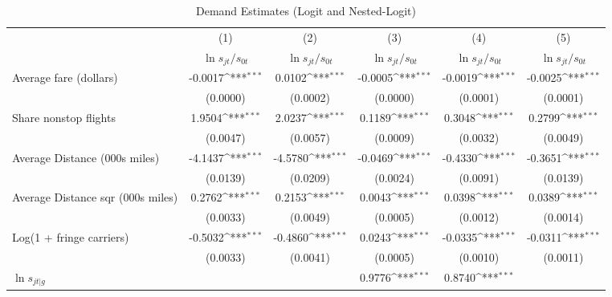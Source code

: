 \begin{table}[htbp]\centering
\def\sym#1{\ifmmode^{#1}\else\(^{#1}\)\fi}
\caption{Demand Estimates (Logit and Nested-Logit)}
\begin{tabular}{l*{5}{c}}
\toprule
                    &\multicolumn{1}{c}{(1)}&\multicolumn{1}{c}{(2)}&\multicolumn{1}{c}{(3)}&\multicolumn{1}{c}{(4)}&\multicolumn{1}{c}{(5)}\\
                    &\multicolumn{1}{c}{$\ln s_{jt}/s_{0t}$}&\multicolumn{1}{c}{$\ln s_{jt}/s_{0t}$}&\multicolumn{1}{c}{$\ln s_{jt}/s_{0t}$}&\multicolumn{1}{c}{$\ln s_{jt}/s_{0t}$}&\multicolumn{1}{c}{$\ln s_{jt}/s_{0t}$}\\
\midrule
Average fare (dollars)&     -0.0017\sym{***}&      0.0102\sym{***}&     -0.0005\sym{***}&     -0.0019\sym{***}&     -0.0025\sym{***}\\
                    &    (0.0000)         &    (0.0002)         &    (0.0000)         &    (0.0001)         &    (0.0001)         \\
\addlinespace
Share nonstop flights &      1.9504\sym{***}&      2.0237\sym{***}&      0.1189\sym{***}&      0.3048\sym{***}&      0.2799\sym{***}\\
                    &    (0.0047)         &    (0.0057)         &    (0.0009)         &    (0.0032)         &    (0.0049)         \\
\addlinespace
Average Distance (000s miles)&     -4.1437\sym{***}&     -4.5780\sym{***}&     -0.0469\sym{***}&     -0.4330\sym{***}&     -0.3651\sym{***}\\
                    &    (0.0139)         &    (0.0209)         &    (0.0024)         &    (0.0091)         &    (0.0139)         \\
\addlinespace
Average Distance sqr (000s miles)&      0.2762\sym{***}&      0.2153\sym{***}&      0.0043\sym{***}&      0.0398\sym{***}&      0.0389\sym{***}\\
                    &    (0.0033)         &    (0.0049)         &    (0.0005)         &    (0.0012)         &    (0.0014)         \\
\addlinespace
Log(1 + fringe carriers)&     -0.5032\sym{***}&     -0.4860\sym{***}&      0.0243\sym{***}&     -0.0335\sym{***}&     -0.0311\sym{***}\\
                    &    (0.0033)         &    (0.0041)         &    (0.0005)         &    (0.0010)         &    (0.0011)         \\
\addlinespace
$\ln s_{jt|g}$      &                     &                     &      0.9776\sym{***}&      0.8740\sym{***}&                     \\

\end{tabular}
\end{table}
